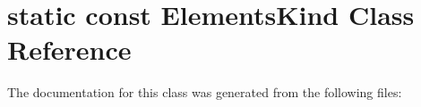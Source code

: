 \hypertarget{classstatic_01const_01ElementsKind}{}\section{static const Elements\+Kind Class Reference}
\label{classstatic_01const_01ElementsKind}


The documentation for this class was generated from the following files\+: